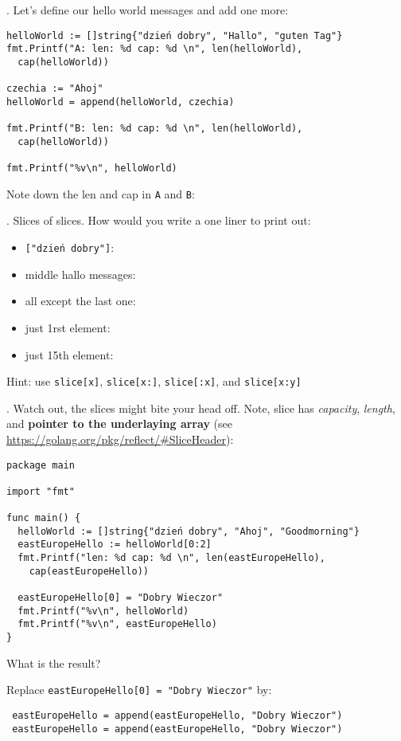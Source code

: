 \documentclass[11pt, letterpaper]{article}
\begin{document}
. Let's define our hello world messages and add one more:

\begin{verbatim}
helloWorld := []string{"dzień dobry", "Hallo", "guten Tag"}
fmt.Printf("A: len: %d cap: %d \n", len(helloWorld),
  cap(helloWorld))

czechia := "Ahoj"
helloWorld = append(helloWorld, czechia)

fmt.Printf("B: len: %d cap: %d \n", len(helloWorld),
  cap(helloWorld))

fmt.Printf("%v\n", helloWorld)
\end{verbatim}

Note down the len and cap in \verb|A| and \verb|B|:

\bigskip
\bigskip
{}. Slices of slices. How would you write a one liner to print out:

\begin{itemize}
  \item \texttt{["dzień dobry"]}: \bigskip
  \item middle hallo messages: \bigskip
  \item all except the last one: \bigskip
  \item just 1rst element: \bigskip
  \item just 15th element: \bigskip
\end{itemize}

Hint: use \verb|slice[x]|, \verb|slice[x:]|, \verb|slice[:x]|, and \verb|slice[x:y]|

. Watch out, the slices might bite your head off. Note, slice has \emph{capacity}, \emph{length}, and \textbf{pointer to the underlaying array} (see \href{reflect.SliceHeader}{https://golang.org/pkg/reflect/\#SliceHeader}):
\begin{verbatim}
package main

import "fmt"

func main() {
  helloWorld := []string{"dzień dobry", "Ahoj", "Goodmorning"}
  eastEuropeHello := helloWorld[0:2]
  fmt.Printf("len: %d cap: %d \n", len(eastEuropeHello),
    cap(eastEuropeHello))

  eastEuropeHello[0] = "Dobry Wieczor"
  fmt.Printf("%v\n", helloWorld)
  fmt.Printf("%v\n", eastEuropeHello)
}
\end{verbatim}
What is the result?

\bigskip
\bigskip
Replace \texttt{eastEuropeHello[0] = "Dobry Wieczor"} by:
\begin{verbatim}
 eastEuropeHello = append(eastEuropeHello, "Dobry Wieczor")
 eastEuropeHello = append(eastEuropeHello, "Dobry Wieczor")
\end{verbatim}
\end{document}
